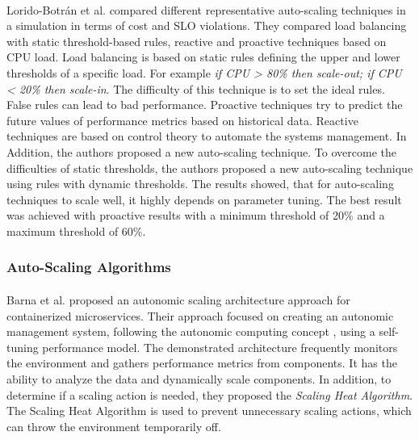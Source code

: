 \paragraph{}Lorido-Botrán et al.  \cite{Botran2013AutoScalingComp} compared different representative auto-scaling techniques in a simulation in terms of cost and SLO violations. They compared load balancing with static threshold-based rules, reactive and proactive techniques based on CPU load.
Load balancing is based on static rules defining the upper and lower thresholds of a specific load. For example \textit{if CPU > 80\% then scale-out; if CPU < 20\% then scale-in}. The difficulty of this technique is to set the ideal rules. False rules can lead to bad performance. Proactive techniques try to predict the future values of performance metrics based on historical data. Reactive techniques are based on control theory to automate the systems management. In Addition, the authors proposed a new auto-scaling technique. To overcome the difficulties of static thresholds, the authors proposed a new auto-scaling technique using rules with dynamic thresholds. The results showed, that for auto-scaling techniques to scale well, it highly depends on parameter tuning. The best result was achieved with proactive results with a minimum threshold of 20\% and a maximum threshold of 60\%.


\subsubsection{Auto-Scaling Algorithms}
\paragraph{}Barna et al. \cite{Barna2017ElasticContainerApps} proposed an autonomic scaling architecture approach for containerized microservices. Their approach focused on creating an autonomic management system, following the autonomic computing concept \cite{Kephart2003VisionComputing}, using a self-tuning performance model. The demonstrated architecture frequently monitors the environment and gathers performance metrics from components. It has the ability to analyze the data and dynamically scale components. In addition, to determine if a scaling action is needed, they proposed the \textit{Scaling Heat Algorithm}. The Scaling Heat Algorithm is used to prevent unnecessary scaling actions, which can throw the environment temporarily off.


